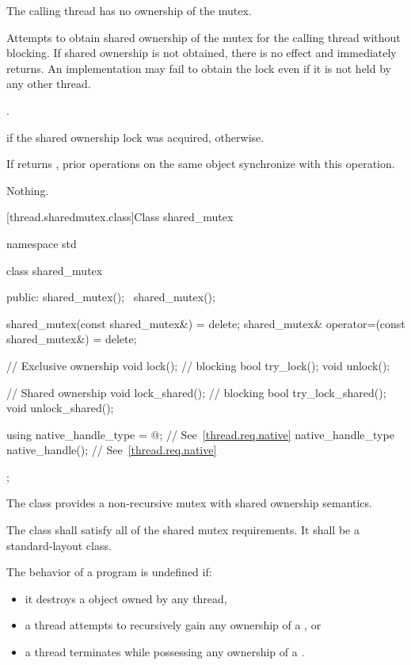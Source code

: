 \begin{itemdescr}
\pnum
\requires The calling thread has no ownership of the mutex.

\pnum
\effects Attempts to obtain shared ownership of the mutex for the calling
thread without blocking. If shared ownership is not obtained, there is no
effect and  immediately returns. An implementation
may fail to obtain the lock even if it is not held by any other thread.

\pnum
\returntype {}.

\pnum
\returns {} if the shared ownership lock was acquired, 
otherwise.

\pnum
\sync If  returns , prior 
operations on the same object synchronize with this
operation.

\pnum
\throws Nothing.
\end{itemdescr}

[thread.sharedmutex.class]{Class shared_mutex}

%
\begin{codeblock}
namespace std {
  class shared_mutex {
  public:
    shared_mutex();
    ~shared_mutex();

    shared_mutex(const shared_mutex&) = delete;
    shared_mutex& operator=(const shared_mutex&) = delete;

    // Exclusive ownership
    void lock(); // blocking
    bool try_lock();
    void unlock();

    // Shared ownership
    void lock_shared(); // blocking
    bool try_lock_shared();
    void unlock_shared();

    using native_handle_type = @\impdefnc@; // See~\ref{thread.req.native}
    native_handle_type native_handle();                // See~\ref{thread.req.native}
  };
}
\end{codeblock}

\pnum
The class  provides a non-recursive mutex
with shared ownership semantics.

\pnum
The class  shall satisfy all of the
shared mutex requirements.
It shall be a standard-layout class.

\pnum
The behavior of a program is undefined if:
\begin{itemize}
\item it destroys a  object owned by any thread,
\item a thread attempts to recursively gain any ownership of a , or
\item a thread terminates while possessing any ownership of a .
\end{itemize}

